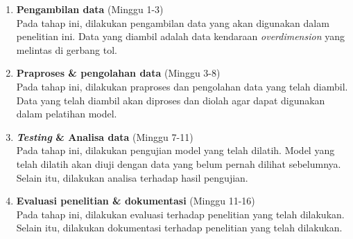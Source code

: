 \begin{enumerate}
  \item \textbf{Pengambilan data} (Minggu 1-3) \\
        Pada tahap ini, dilakukan pengambilan data yang akan digunakan dalam penelitian ini. Data yang diambil adalah data kendaraan \emph{overdimension} yang melintas di gerbang tol.

  \item \textbf{Praproses \& pengolahan data} (Minggu 3-8) \\
        Pada tahap ini, dilakukan praproses dan pengolahan data yang telah diambil. Data yang telah diambil akan diproses dan diolah agar dapat digunakan dalam pelatihan model.

  \item \textbf{\emph{Testing} \& Analisa data} (Minggu 7-11) \\
        Pada tahap ini, dilakukan pengujian model yang telah dilatih. Model yang telah dilatih akan diuji dengan data yang belum pernah dilihat sebelumnya. Selain itu, dilakukan analisa terhadap hasil pengujian.

  \item \textbf{Evaluasi penelitian \& dokumentasi} (Minggu 11-16) \\
        Pada tahap ini, dilakukan evaluasi terhadap penelitian yang telah dilakukan. Selain itu, dilakukan dokumentasi terhadap penelitian yang telah dilakukan.
\end{enumerate}